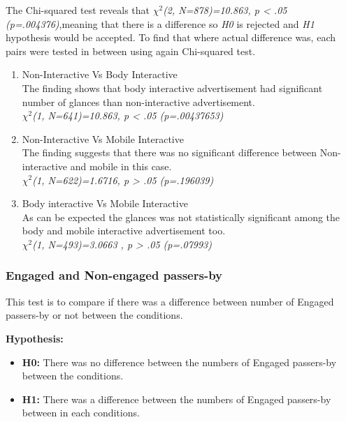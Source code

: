 The Chi-squared test reveals that ${\chi}^2$\emph{(2, N=878)=10.863, p < .05 (p=.004376)},meaning that there is a difference so \emph{H0} is rejected and \emph{H1} hypothesis would be accepted.
To find that where actual difference was, each pairs were tested in between using again Chi-squared test.

\begin{enumerate}
\item Non-Interactive Vs Body Interactive \\
The finding shows that body interactive advertisement had significant number of glances than non-interactive advertisement. \\
${\chi}^2$\emph{(1, N=641)=10.863, p < .05 (p=.00437653)}



\item Non-Interactive Vs Mobile Interactive  \\
The finding suggests that there was no significant difference between Non-interactive and mobile in this case.\\
${\chi}^2$\emph{(1, N=622)=1.6716, p > .05 (p=.196039)}

\item Body interactive Vs Mobile Interactive \\
As can be expected the glances was not statistically significant among the body and mobile interactive advertisement too.\\
${\chi}^2$\emph{(1, N=493)=3.0663 , p > .05 (p=.07993)}

\end{enumerate}


\subsubsection {Engaged and Non-engaged passers-by}
This test is to compare if there was a difference between number of Engaged passers-by or not between the conditions.

\textbf{Hypothesis: }
\begin{itemize}
\item \textbf{H0:} There was no difference between the numbers of Engaged passers-by between the conditions.
\item \textbf{H1:} There was a difference between the numbers of Engaged passers-by between in each conditions.
\end{itemize}

